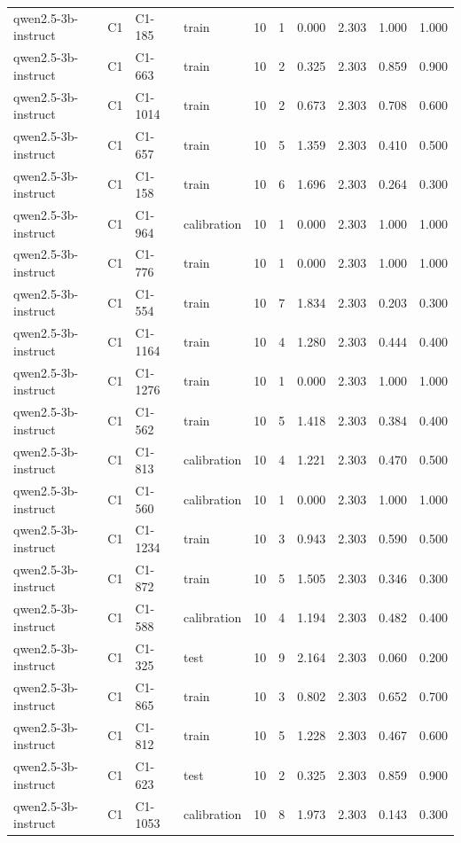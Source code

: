 \begin{table}
\begin{tabular}{llllrrrrrr}
qwen2.5-3b-instruct & C1 & C1-185 & train & 10 & 1 & 0.000 & 2.303 & 1.000 & 1.000 \\
qwen2.5-3b-instruct & C1 & C1-663 & train & 10 & 2 & 0.325 & 2.303 & 0.859 & 0.900 \\
qwen2.5-3b-instruct & C1 & C1-1014 & train & 10 & 2 & 0.673 & 2.303 & 0.708 & 0.600 \\
qwen2.5-3b-instruct & C1 & C1-657 & train & 10 & 5 & 1.359 & 2.303 & 0.410 & 0.500 \\
qwen2.5-3b-instruct & C1 & C1-158 & train & 10 & 6 & 1.696 & 2.303 & 0.264 & 0.300 \\
qwen2.5-3b-instruct & C1 & C1-964 & calibration & 10 & 1 & 0.000 & 2.303 & 1.000 & 1.000 \\
qwen2.5-3b-instruct & C1 & C1-776 & train & 10 & 1 & 0.000 & 2.303 & 1.000 & 1.000 \\
qwen2.5-3b-instruct & C1 & C1-554 & train & 10 & 7 & 1.834 & 2.303 & 0.203 & 0.300 \\
qwen2.5-3b-instruct & C1 & C1-1164 & train & 10 & 4 & 1.280 & 2.303 & 0.444 & 0.400 \\
qwen2.5-3b-instruct & C1 & C1-1276 & train & 10 & 1 & 0.000 & 2.303 & 1.000 & 1.000 \\
qwen2.5-3b-instruct & C1 & C1-562 & train & 10 & 5 & 1.418 & 2.303 & 0.384 & 0.400 \\
qwen2.5-3b-instruct & C1 & C1-813 & calibration & 10 & 4 & 1.221 & 2.303 & 0.470 & 0.500 \\
qwen2.5-3b-instruct & C1 & C1-560 & calibration & 10 & 1 & 0.000 & 2.303 & 1.000 & 1.000 \\
qwen2.5-3b-instruct & C1 & C1-1234 & train & 10 & 3 & 0.943 & 2.303 & 0.590 & 0.500 \\
qwen2.5-3b-instruct & C1 & C1-872 & train & 10 & 5 & 1.505 & 2.303 & 0.346 & 0.300 \\
qwen2.5-3b-instruct & C1 & C1-588 & calibration & 10 & 4 & 1.194 & 2.303 & 0.482 & 0.400 \\
qwen2.5-3b-instruct & C1 & C1-325 & test & 10 & 9 & 2.164 & 2.303 & 0.060 & 0.200 \\
qwen2.5-3b-instruct & C1 & C1-865 & train & 10 & 3 & 0.802 & 2.303 & 0.652 & 0.700 \\
qwen2.5-3b-instruct & C1 & C1-812 & train & 10 & 5 & 1.228 & 2.303 & 0.467 & 0.600 \\
qwen2.5-3b-instruct & C1 & C1-623 & test & 10 & 2 & 0.325 & 2.303 & 0.859 & 0.900 \\
qwen2.5-3b-instruct & C1 & C1-1053 & calibration & 10 & 8 & 1.973 & 2.303 & 0.143 & 0.300 \\

\end{tabular}
\end{table}
